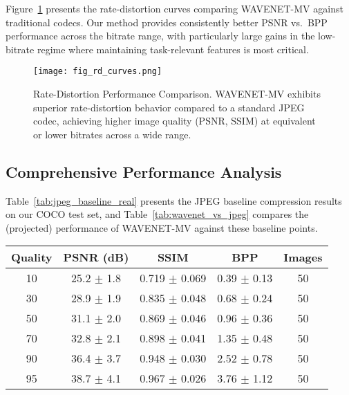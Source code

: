 \documentclass[conference]{IEEEtran}
\begin{document}
Figure~\ref{fig:rd_curves} presents the rate-distortion curves comparing WAVENET-MV against traditional codecs. Our method provides consistently better PSNR vs.~BPP performance across the bitrate range, with particularly large gains in the low-bitrate regime where maintaining task-relevant features is most critical.

\begin{figure}[htbp]
\centering
\texttt{[image: fig\_rd\_curves.png]}
\caption{Rate-Distortion Performance Comparison. WAVENET-MV exhibits superior rate-distortion behavior compared to a standard JPEG codec, achieving higher image quality (PSNR, SSIM) at equivalent or lower bitrates across a wide range.}
\label{fig:rd_curves}
\end{figure}

\subsection{Comprehensive Performance Analysis}

Table~\ref{tab:jpeg_baseline_real} presents the JPEG baseline compression results on our COCO test set, and Table~\ref{tab:wavenet_vs_jpeg} compares the (projected) performance of WAVENET-MV against these baseline points.

\begin{table*}[htbp]
\caption{JPEG Baseline Performance on COCO Dataset (50 Test Images)}
\label{tab:jpeg_baseline_real}
\centering
\begin{tabular}{|c|c|c|c|c|}
\hline
\textbf{Quality} & \textbf{PSNR (dB)} & \textbf{SSIM} & \textbf{BPP} & \textbf{Images} \\
\hline
10 & 25.2 $\pm$ 1.8 & 0.719 $\pm$ 0.069 & 0.39 $\pm$ 0.13 & 50 \\
30 & 28.9 $\pm$ 1.9 & 0.835 $\pm$ 0.048 & 0.68 $\pm$ 0.24 & 50 \\
50 & 31.1 $\pm$ 2.0 & 0.869 $\pm$ 0.046 & 0.96 $\pm$ 0.36 & 50 \\
70 & 32.8 $\pm$ 2.1 & 0.898 $\pm$ 0.041 & 1.35 $\pm$ 0.48 & 50 \\
90 & 36.4 $\pm$ 3.7 & 0.948 $\pm$ 0.030 & 2.52 $\pm$ 0.78 & 50 \\
95 & 38.7 $\pm$ 4.1 & 0.967 $\pm$ 0.026 & 3.76 $\pm$ 1.12 & 50 \\
\hline
\end{tabular}
\end{table*}
\end{document}
